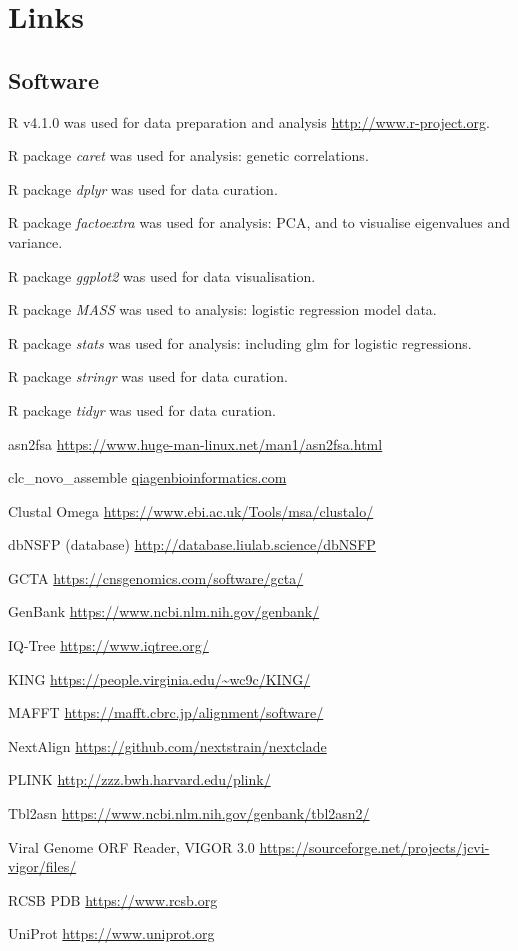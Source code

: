 \documentclass{article} %
\begin{document}
\section{Links}
\subsection{Software}
\begin{description}[noitemsep]

\item R v4.1.0 was used for data preparation and analysis \url{http://www.r-project.org}.
\item R package \textit{caret} was used for analysis: genetic correlations.
\item R package \textit{dplyr} was used for data curation.
\item R package \textit{factoextra} was used for analysis: PCA, and to visualise eigenvalues and variance.
\item R package \textit{ggplot2} was used for data visualisation.
\item R package \textit{MASS} was used to analysis: logistic regression model data.
\item R package \textit{stats} was used for analysis: including glm for logistic regressions. 
\item R package \textit{stringr} was used for data curation.
\item R package \textit{tidyr} was used for data curation.
\item asn2fsa \url{https://www.huge-man-linux.net/man1/asn2fsa.html}
\item clc\_novo\_assemble \href{https://resources.qiagenbioinformatics.com/manuals
/clcgenomicsworkbench/852/index.php?manual=De_novo_assembly.html}{qiagenbioinformatics.com} \
\item Clustal Omega \url{https://www.ebi.ac.uk/Tools/msa/clustalo/}
\item dbNSFP (database) \url{http://database.liulab.science/dbNSFP} \citep{liu2016dbnsfp}
\item GCTA \url{https://cnsgenomics.com/software/gcta/} \citep{yang2011gcta}
\item GenBank \url{https://www.ncbi.nlm.nih.gov/genbank/}
\item IQ-Tree \url{https://www.iqtree.org/} \citep{nguyen2015iq}
\item KING \url{https://people.virginia.edu/~wc9c/KING/} \citep{manichaikul_robust_2010}
\item MAFFT \url{https://mafft.cbrc.jp/alignment/software/} \citep{katoh2013mafft}
\item NextAlign \url{https://github.com/nextstrain/nextclade}
\item PLINK \url{http://zzz.bwh.harvard.edu/plink/} \citep{purcell2007plink}
\item Tbl2asn \url{https://www.ncbi.nlm.nih.gov/genbank/tbl2asn2/}
\item Viral Genome ORF Reader, VIGOR 3.0 \url{https://sourceforge.net/projects/jcvi-vigor/files/}
\item RCSB PDB \url{https://www.rcsb.org}
\item UniProt \url{https://www.uniprot.org}


\end{description}
\end{document}

